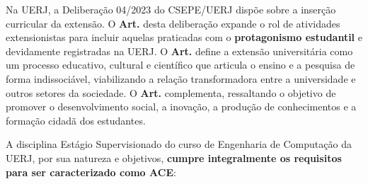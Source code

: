 Na UERJ, a Deliberação  04/2023 do CSEPE/UERJ dispõe sobre a inserção curricular da extensão. O \textbf{Art. } desta deliberação expande o rol de atividades extensionistas para incluir aquelas praticadas com o \textbf{protagonismo estudantil} e devidamente registradas na UERJ. O \textbf{Art. } define a extensão universitária como um processo educativo, cultural e científico que articula o ensino e a pesquisa de forma indissociável, viabilizando a relação transformadora entre a universidade e outros setores da sociedade. O \textbf{Art. } complementa, ressaltando o objetivo de promover o desenvolvimento social, a inovação, a produção de conhecimentos e a formação cidadã dos estudantes.

A disciplina Estágio Supervisionado do curso de Engenharia de Computação da UERJ, por sua natureza e objetivos, \textbf{cumpre integralmente os requisitos para ser caracterizado como ACE}:

